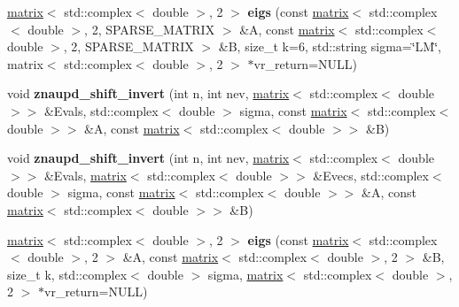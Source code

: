\begin{DoxyCompactItemize}
\item 
\hypertarget{namespacekeycpp_a810da39d5f5a17a95f17fa2c3a27582e}{\hyperlink{classkeycpp_1_1matrix}{matrix}$<$ std\-::complex$<$ double $>$, 2 $>$ {\bfseries eigs} (const \hyperlink{classkeycpp_1_1matrix}{matrix}$<$ std\-::complex$<$ double $>$, 2, S\-P\-A\-R\-S\-E\-\_\-\-M\-A\-T\-R\-I\-X $>$ \&A, const \hyperlink{classkeycpp_1_1matrix}{matrix}$<$ std\-::complex$<$ double $>$, 2, S\-P\-A\-R\-S\-E\-\_\-\-M\-A\-T\-R\-I\-X $>$ \&B, size\-\_\-t k=6, std\-::string sigma=\char`\"{}L\-M\char`\"{}, matrix$<$ std\-::complex$<$ double $>$, 2 $>$ $\ast$vr\-\_\-return=N\-U\-L\-L)}\label{namespacekeycpp_a810da39d5f5a17a95f17fa2c3a27582e}

\item 
\hypertarget{namespacekeycpp_ad5f126fb68111219bcb4183b9bb20310}{void {\bfseries znaupd\-\_\-shift\-\_\-invert} (int n, int nev, \hyperlink{classkeycpp_1_1matrix}{matrix}$<$ std\-::complex$<$ double $>$$>$ \&Evals, std\-::complex$<$ double $>$ sigma, const \hyperlink{classkeycpp_1_1matrix}{matrix}$<$ std\-::complex$<$ double $>$$>$ \&A, const \hyperlink{classkeycpp_1_1matrix}{matrix}$<$ std\-::complex$<$ double $>$$>$ \&B)}\label{namespacekeycpp_ad5f126fb68111219bcb4183b9bb20310}

\item 
\hypertarget{namespacekeycpp_acd3346eee20a40d90dd887267b4abb3d}{void {\bfseries znaupd\-\_\-shift\-\_\-invert} (int n, int nev, \hyperlink{classkeycpp_1_1matrix}{matrix}$<$ std\-::complex$<$ double $>$$>$ \&Evals, \hyperlink{classkeycpp_1_1matrix}{matrix}$<$ std\-::complex$<$ double $>$$>$ \&Evecs, std\-::complex$<$ double $>$ sigma, const \hyperlink{classkeycpp_1_1matrix}{matrix}$<$ std\-::complex$<$ double $>$$>$ \&A, const \hyperlink{classkeycpp_1_1matrix}{matrix}$<$ std\-::complex$<$ double $>$$>$ \&B)}\label{namespacekeycpp_acd3346eee20a40d90dd887267b4abb3d}

\item 
\hypertarget{namespacekeycpp_af0a6f7a9249e745a7420c9292e3bc374}{\hyperlink{classkeycpp_1_1matrix}{matrix}$<$ std\-::complex$<$ double $>$, 2 $>$ {\bfseries eigs} (const \hyperlink{classkeycpp_1_1matrix}{matrix}$<$ std\-::complex$<$ double $>$, 2 $>$ \&A, const \hyperlink{classkeycpp_1_1matrix}{matrix}$<$ std\-::complex$<$ double $>$, 2 $>$ \&B, size\-\_\-t k, std\-::complex$<$ double $>$ sigma, \hyperlink{classkeycpp_1_1matrix}{matrix}$<$ std\-::complex$<$ double $>$, 2 $>$ $\ast$vr\-\_\-return=N\-U\-L\-L)}\label{namespacekeycpp_af0a6f7a9249e745a7420c9292e3bc374}

\end{DoxyCompactItemize}


